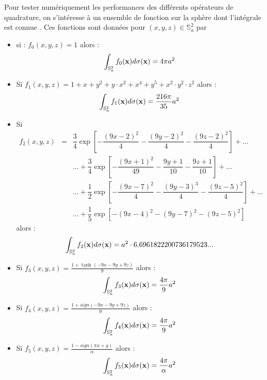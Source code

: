 Pour tester numériquement les performances des différents opérateurs de quadrature, on s’intéresse à un ensemble de fonction sur la sphère dont l'intégrale est connue \cite{Beetjes2015, Fornberg2014}. Ces fonctions sont données pour $(x,y,z) \in \mathbb{S}_a^2$ par
\begin{itemize}
\item si : $f_0(x,y,z)=1$ alors :
\begin{equation}
\displaystyle\int_{\mathbb{S}_a^2} f_0(\mathbf{x}) d\sigma (\mathbf{x})=4 \pi a^2
\end{equation}
\item Si $f_1(x,y,z)=1+x+y^2+y\cdot x^2+x^4+y^5+x^2 \cdot y^2 \cdot z^2$ alors :
\begin{equation}
\displaystyle\int_{\mathbb{S}_a^2} f_1(\mathbf{x}) d\sigma (\mathbf{x})=\dfrac{216 \pi}{35} a^2
\end{equation}
\item Si 
\begin{equation}
\begin{array}{rcl}
f_2(x,y,z) & = & \dfrac{3}{4} \exp \left[ - \dfrac{(9x-2)^2}{4} - \dfrac{(9y-2)^2}{4} - \dfrac{(9z-2)^2}{4} \right] + ...\\
& & ... + \dfrac{3}{4} \exp \left[ - \dfrac{(9x+1)^2}{49} - \dfrac{9y+1}{10} - \dfrac{9z+1}{10} \right] + ...\\
& & ... + \dfrac{1}{2} \exp \left[ - \dfrac{(9x-7)^2}{4} - \dfrac{(9y-3)^3}{4} - \dfrac{(9z-5)^2}{4} \right] + ...\\
& &... + \dfrac{1}{5} \exp \left[ - (9x-4)^2 - (9y-7)^2 - (9z-5)^2 \right]
\end{array}
\end{equation}
alors :
\begin{equation}
\displaystyle\int_{\mathbb{S}_a^2} f_2(\mathbf{x}) d\sigma (\mathbf{x})=a^2 \cdot 6.6961822200736179523...
\end{equation}
\item Si $f_3(x,y,z)=\frac{1+\tanh(-9x-9y+9z)}{9}$ alors :
\begin{equation}
\displaystyle\int_{\mathbb{S}_a^2} f_3(\mathbf{x}) d\sigma (\mathbf{x})=\frac{4\pi}{9} a^2
\end{equation}
\item Si $f_4(x,y,z)=\frac{1+sign(-9x-9y+9z)}{9}$ alors :
\begin{equation}
\displaystyle\int_{\mathbb{S}_a^2} f_4(\mathbf{x}) d\sigma (\mathbf{x})=\frac{4\pi}{9} a^2
\end{equation}
\item Si $f_5(x,y,z)=\frac{1-sign(\pi x + y)}{\alpha}$ alors :
\begin{equation}
\displaystyle\int_{\mathbb{S}_a^2} f_5(\mathbf{x}) d\sigma (\mathbf{x})=\frac{4\pi}{\alpha} a^2
\end{equation}
\end{itemize}


